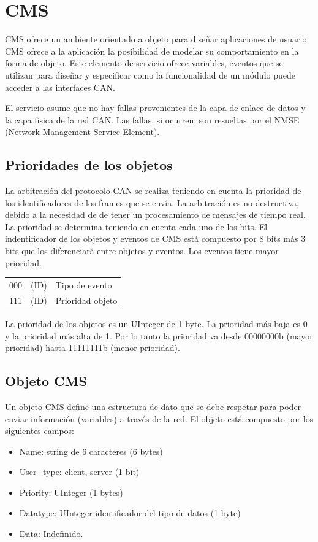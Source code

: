\section{CMS}
CMS ofrece un ambiente orientado a objeto para diseñar aplicaciones de usuario. CMS ofrece a la aplicación la posibilidad de modelar su comportamiento en la forma de objeto. Este elemento de servicio ofrece variables, eventos que se utilizan para diseñar y especificar como la funcionalidad de un módulo puede acceder a las interfaces CAN.

El servicio asume que no hay fallas provenientes de la capa de enlace de datos y la capa física de la red CAN. Las fallas, si ocurren, son resueltas por el NMSE (Network Management Service Element).

\subsection{Prioridades de los objetos}
La arbitración del protocolo CAN se realiza teniendo en cuenta la prioridad de los identificadores de los frames que se envía. La arbitración es no destructiva, debido a la necesidad de de tener un procesamiento de mensajes de tiempo real. La prioridad se determina teniendo en cuenta cada uno de los bits. El indentificador de los objetos y eventos de CMS está compuesto por 8 bits más 3 bits que los diferenciará entre objetos y eventos. Los eventos tiene mayor prioridad.

\begin{tabular}{lll}
    000 & (ID) & Tipo de evento \\
    111 & (ID) & Prioridad objeto \\
\end{tabular}

La prioridad de los objetos es un UInteger de 1 byte. La prioridad más baja es 0 y la prioridad más alta de 1. Por lo tanto la prioridad va desde 00000000b (mayor prioridad) hasta 11111111b (menor prioridad).

\subsection{Objeto CMS}
Un objeto CMS define una estructura de dato que se debe respetar para poder enviar información (variables) a través de la red. El objeto está compuesto por los siguientes campos:
\begin{itemize}
   \item Name: string de 6 caracteres (6 bytes)
   \item User\_type: {client, server} (1 bit)
   \item Priority: UInteger (1 bytes)
   \item Datatype: UInteger identificador del tipo de datos (1 byte)
   \item Data: Indefinido.
\end{itemize}

